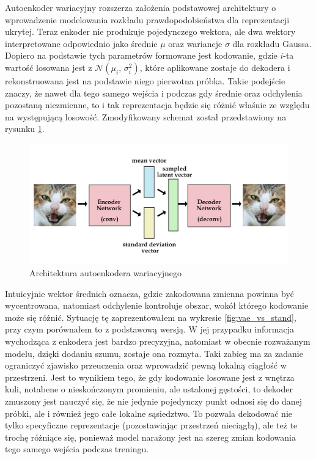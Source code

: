 Autoenkoder wariacyjny rozszerza założenia podstawowej architektury o wprowadzenie modelowania rozkładu prawdopodobieństwa dla reprezentacji ukrytej. Teraz enkoder nie produkuje pojedynczego wektora, ale dwa wektory interpretowane odpowiednio jako średnie $\mu$ oraz wariancje $\sigma$ dla rozkładu Gaussa. Dopiero na podstawie tych parametrów formowane jest kodowanie, gdzie $i$-ta wartość losowana jest z $\mathcal{N}(\mu_{i},\,\sigma_{i}^{2})$, które aplikowane zostaje do dekodera i rekonstruowana jest na podstawie niego pierwotna próbka. Takie podejście znaczy, że nawet dla tego samego wejścia i podczas gdy średnie oraz odchylenia pozostaną niezmienne, to i tak reprezentacja będzie się różnić właśnie ze względu na występującą losowość. Zmodyfikowany schemat został przedstawiony na rysunku \ref{fig:vae_model}.

\begin{figure}[h!]
    \centering
    \includegraphics[width=1.0\textwidth]{images/vae_model}
    \caption{Architektura autoenkodera wariacyjnego}
    \label{fig:vae_model}
\end{figure}

Intuicyjnie wektor średnich oznacza, gdzie zakodowana zmienna powinna być wycentrowana, natomiast odchylenie kontroluje obszar, wokół którego kodowanie może się różnić. Sytuację tę zaprezentowałem na wykresie \ref{fig:vae_vs_stand}, przy czym porównałem to z podstawową wersją. W jej przypadku informacja wychodząca z enkodera jest bardzo precyzyjna, natomiast w obecnie rozważanym modelu, dzięki dodaniu szumu, zostaje ona rozmyta. Taki zabieg ma za zadanie ograniczyć zjawisko przeuczenia oraz wprowadzić pewną lokalną ciągłość w przestrzeni. Jest to wynikiem tego, że gdy kodowanie losowane jest z wnętrza kuli, notabene o nieskończonym promieniu, ale ustalonej gęstości, to dekoder zmuszony jest nauczyć się, że nie jedynie pojedynczy punkt odnosi się do danej próbki, ale i również jego całe lokalne sąsiedztwo. To pozwala dekodować nie tylko specyficzne reprezentacje (pozostawiając przestrzeń nieciągłą), ale też te trochę różniące się, ponieważ model narażony jest na szereg zmian kodowania tego samego wejścia podczas treningu.

